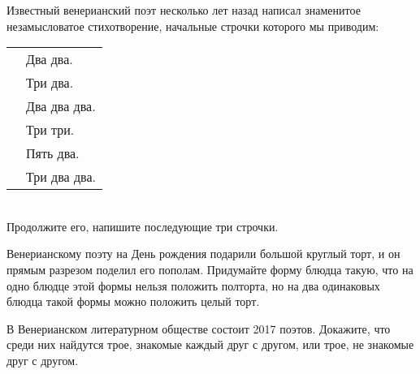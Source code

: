 ﻿
\begin{itemize}

\itA Известный венерианский поэт несколько лет назад написал знаменитое незамысловатое стихотворение, начальные строчки которого мы приводим: \\
\begin{tabular}{p{1.7cm}l}
& Два два. \\
& Три два. \\
& Два два два. \\
& Три три. \\
& Пять два. \\
& Три два два.
\end{tabular} \\
Продолжите его, напишите последующие три строчки.

\itB Венерианскому поэту на День рождения подарили большой круглый торт, и он прямым разрезом поделил его пополам. Придумайте форму блюдца такую, что на одно блюдце этой формы нельзя положить полторта, но на два одинаковых блюдца такой формы можно положить целый торт.

\itC В Венерианском литературном обществе состоит 2017 поэтов. Докажите, что среди них найдутся трое, знакомые каждый друг с другом, или трое, не знакомые друг с другом.
\end{itemize}